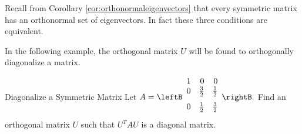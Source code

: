 Recall from Corollary \ref{cor:orthonormaleigenvectors} that every symmetric matrix has an orthonormal set of eigenvectors. In fact these three conditions are equivalent. 

In the following example, the orthogonal
matrix $U$ will be found to orthogonally diagonalize a matrix. 

\begin{example}{Diagonalize a Symmetric Matrix}\label{exa:orthdiag}
Let $A=\leftB
\begin{array}{rrr}
1 & 0 & 0 \\
0 &
\vspace{0.05in}\frac{3}{2} & \vspace{0.05in}\frac{1}{2} \\
0 & \vspace{0.05in}\frac{1}{2} & \vspace{0.05in}\frac{3}{2}
\end{array}
\rightB .$ Find an orthogonal matrix $U$ such that $U^{T}AU$ is a diagonal
matrix.
\end{example}

